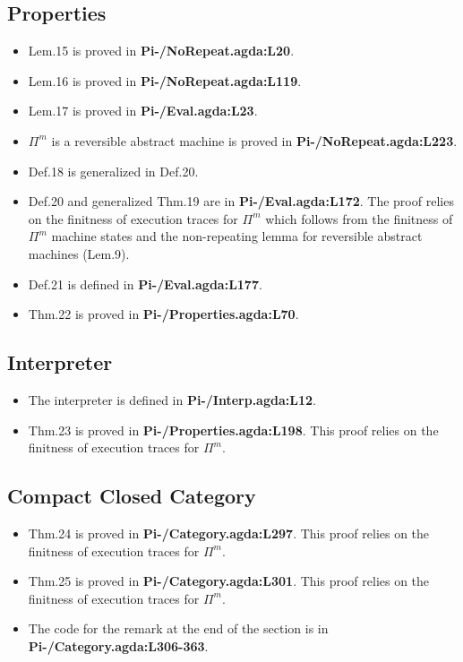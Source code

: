 \documentclass{article}
\begin{document}
\subsection{Properties}
\begin{itemize}
\item Lem.15 is proved in \textbf{Pi-/NoRepeat.agda:L20}.
\item Lem.16 is proved in \textbf{Pi-/NoRepeat.agda:L119}.
\item Lem.17 is proved in \textbf{Pi-/Eval.agda:L23}.
\item $\Pi^m$ is a reversible abstract machine is proved in \textbf{Pi-/NoRepeat.agda:L223}.
\item Def.18 is generalized in Def.20.
\item Def.20 and generalized Thm.19 are in
  \textbf{Pi-/Eval.agda:L172}. The proof relies on the finitness of
  execution traces  for $\Pi^m$ which follows from the finitness of
  $\Pi^m$ machine states and the non-repeating lemma for reversible abstract
  machines (Lem.9).
\item Def.21 is defined in \textbf{Pi-/Eval.agda:L177}.
\item Thm.22 is proved in \textbf{Pi-/Properties.agda:L70}.
\end{itemize}

\subsection{Interpreter}
\begin{itemize}
\item The interpreter is defined in \textbf{Pi-/Interp.agda:L12}.
\item Thm.23 is proved in \textbf{Pi-/Properties.agda:L198}. This proof relies on the finitness of execution traces
  for $\Pi^m$.
\end{itemize}

\subsection{Compact Closed Category}
\begin{itemize}
\item Thm.24 is proved in \textbf{Pi-/Category.agda:L297}. This proof relies on the finitness of execution traces
  for $\Pi^m$.
\item Thm.25 is proved in \textbf{Pi-/Category.agda:L301}. This proof relies on the finitness of execution traces
  for $\Pi^m$.
\item The code for the remark at the end of the section is in \textbf{Pi-/Category.agda:L306-363}.
\end{itemize}
\end{document}
